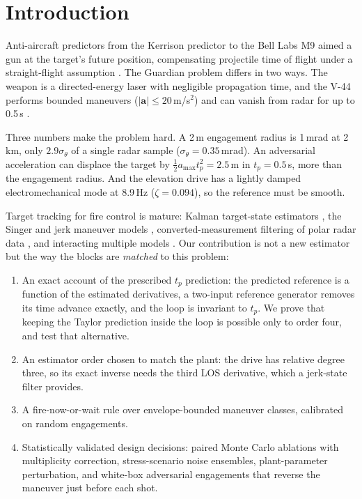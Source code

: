 \documentclass[conference]{IEEEtran}
\begin{document}
\section{Introduction}
Anti-aircraft predictors from the Kerrison predictor to the Bell Labs M9 aimed a gun at the target's future position, compensating projectile time of flight under a straight-flight assumption \cite{spec2026}. The Guardian problem differs in two ways. The weapon is a directed-energy laser with negligible propagation time, and the V-44 performs bounded maneuvers ($|\mathbf a|\le 20$\,m/s$^2$) and can vanish from radar for up to 0.5\,s \cite{spec2026}.

Three numbers make the problem hard. A 2\,m engagement radius is 1\,mrad at 2\,km, only $2.9\sigma_\theta$ of a single radar sample ($\sigma_\theta=0.35$\,mrad). An adversarial acceleration can displace the target by $\tfrac12 a_{\max}t_p^2=2.5$\,m in $t_p=0.5$\,s, more than the engagement radius. And the elevation drive has a lightly damped electromechanical mode at 8.9\,Hz ($\zeta=0.094$), so the reference must be smooth.

Target tracking for fire control is mature: Kalman target-state estimators \cite{barshalom2001}, the Singer and jerk maneuver models \cite{singer1970,mehrotra1997jerk,li2003survey}, converted-measurement filtering of polar radar data \cite{lerro1993}, and interacting multiple models \cite{mazor1998imm}. Our contribution is not a new estimator but the way the blocks are \emph{matched} to this problem:
\begin{enumerate}
\item An exact account of the prescribed $t_p$ prediction: the predicted reference is a function of the estimated derivatives, a two-input reference generator removes its time advance exactly, and the loop is invariant to $t_p$. We prove that keeping the Taylor prediction inside the loop is possible only to order four, and test that alternative.
\item An estimator order chosen to match the plant: the drive has relative degree three, so its exact inverse needs the third LOS derivative, which a jerk-state filter provides.
\item A fire-now-or-wait rule over envelope-bounded maneuver classes, calibrated on random engagements.
\item Statistically validated design decisions: paired Monte Carlo ablations with multiplicity correction, stress-scenario noise ensembles, plant-parameter perturbation, and white-box adversarial engagements that reverse the maneuver just before each shot.
\end{enumerate}
\end{document}
